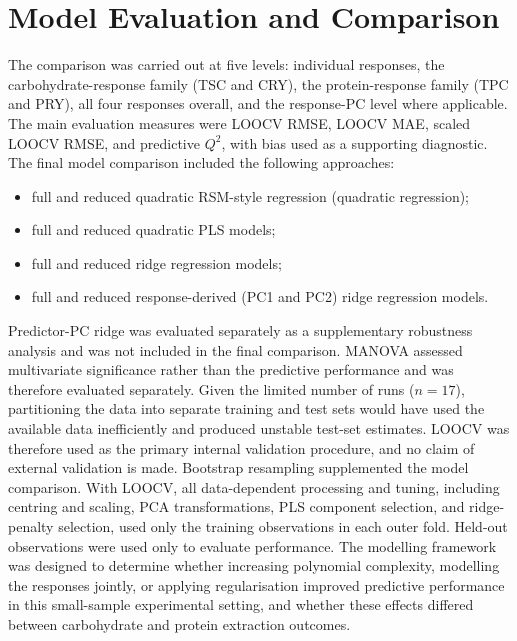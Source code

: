 \documentclass[MScDSA]{uccthesis}
\begin{document}
\section{Model Evaluation and Comparison}
\label{sec:model_evaluation_and_comparison}
The comparison was carried out at five levels: individual responses, the carbohydrate-response family (TSC and CRY), the protein-response family (TPC and PRY), all four responses overall, and the response-PC level where applicable. The main evaluation measures were LOOCV RMSE, LOOCV MAE, scaled LOOCV RMSE, and predictive $Q^2$, with bias used as a supporting diagnostic. The final model comparison included the following approaches:
\begin{itemize}
    \item full and reduced quadratic RSM-style regression (quadratic regression);
    \item full and reduced quadratic PLS models;
    \item full and reduced ridge regression models;
    \item full and reduced response-derived (PC1 and PC2) ridge regression models.
\end{itemize}

Predictor-PC ridge was evaluated separately as a supplementary robustness analysis and was not included in the final comparison. MANOVA assessed multivariate significance rather than the predictive performance and was therefore evaluated separately.
Given the limited number of runs ($n=17$), partitioning the data into separate training and test sets would have used the available data inefficiently and produced unstable test-set estimates. LOOCV was therefore used as the primary internal validation procedure, and no claim of external validation is made. Bootstrap resampling supplemented the model comparison. With LOOCV, all data-dependent processing and tuning, including centring and scaling, PCA transformations, PLS component selection, and ridge-penalty selection, used only the training observations in each outer fold. Held-out observations were used only to evaluate performance.
The modelling framework was designed to determine whether increasing polynomial complexity, modelling the responses jointly, or applying regularisation improved predictive performance in this small-sample experimental setting, and whether these effects differed between carbohydrate and protein extraction outcomes.
\end{document}
